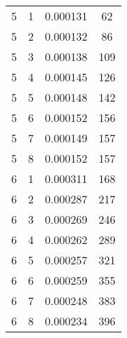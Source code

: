 \documentclass{article}
\begin{document}
\begin{table}[h!]
\begin{center}
\begin{tabular}{c|c|c|c}
5 & 1 & 0.000131 & 62\\
5 & 2 & 0.000132 & 86\\
5 & 3 & 0.000138 & 109\\
5 & 4 & 0.000145 & 126\\
5 & 5 & 0.000148 & 142\\
5 & 6 & 0.000152 & 156\\
5 & 7 & 0.000149 & 157\\
5 & 8 & 0.000152 & 157\\
6 & 1 & 0.000311 & 168\\
6 & 2 & 0.000287 & 217\\
6 & 3 & 0.000269 & 246\\
6 & 4 & 0.000262 & 289\\
6 & 5 & 0.000257 & 321\\
6 & 6 & 0.000259 & 355\\
6 & 7 & 0.000248 & 383\\
6 & 8 & 0.000234 & 396\\
    \end{tabular}
  \end{center}
\end{table}
\end{document}
